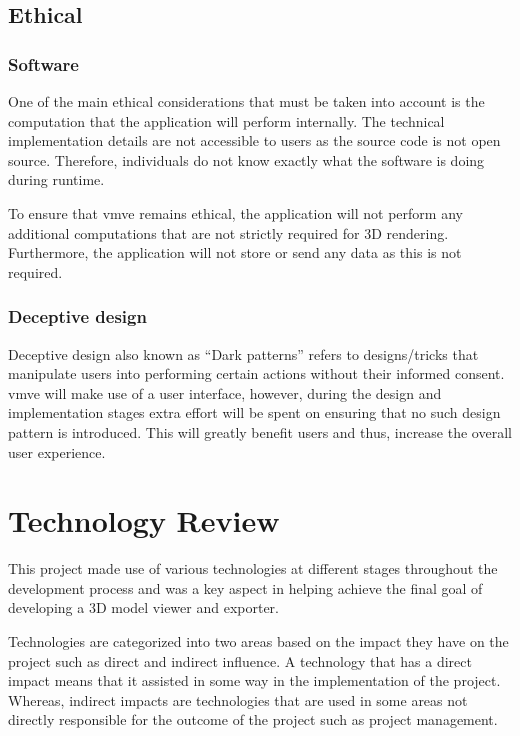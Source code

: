 \documentclass[11pt]{article}
\begin{document}
\subsection{Ethical}


\subsubsection{Software}
One of the main ethical considerations that must be taken into account is the
computation that the application will perform internally. The technical
implementation details are not accessible to users as the source code is not
open source. Therefore, individuals do not know exactly what the software is
doing during runtime.

To ensure that \gls{vmve} remains ethical, the application will not perform any
additional computations that are not strictly required for 3D rendering.
Furthermore, the application will not store or send any data as this is not
required.

\subsubsection{Deceptive design}
Deceptive design also known as ``Dark patterns'' refers to designs/tricks that
manipulate users into performing certain actions without their informed consent.
\gls{vmve} will make use of a user interface, however, during the design and
implementation stages extra effort will be spent on ensuring that no such design
pattern is introduced. This will greatly benefit users and thus, increase the
overall user experience.

\clearpage
\section{Technology Review} \label{technology_review}
This project made use of various technologies at different stages throughout the
development process and was a key aspect in helping achieve the final goal of
developing a 3D model viewer and exporter.

Technologies are categorized into two areas based on the impact they have on the
project such as direct and indirect influence. A technology that has a direct
impact means that it assisted in some way in the implementation of the project.
Whereas, indirect impacts are technologies that are used in some areas not
directly responsible for the outcome of the project such as project management.
\end{document}
